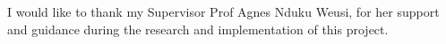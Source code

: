 I would like to thank my Supervisor Prof Agnes Nduku Weusi, for her support and guidance during the research and implementation of this project.


